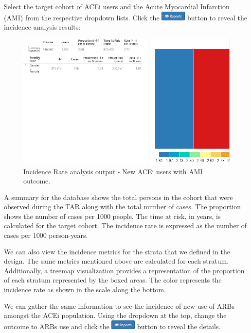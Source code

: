 \documentclass[11pt]{book}
\theoremstyle{definition}
\theoremstyle{definition}
\theoremstyle{definition}
\theoremstyle{remark}
\begin{document}
Select the target cohort of ACEi users and the Acute Myocardial Infarction (AMI) from the respective dropdown lists. Click the \includegraphics{images/Characterization/atlasIncidenceReportButton.png} button to reveal the incidence analysis results:

\begin{figure}

{\centering \includegraphics[width=1\linewidth]{images/Characterization/atlasIncidenceResults} 

}

\caption{Incidence Rate analysis output - New ACEi users with AMI outcome.}\label{fig:atlasIncidenceResults}
\end{figure}

A summary for the database shows the total persons in the cohort that were observed during the TAR along with the total number of cases. The proportion shows the number of cases per 1000 people. The time at risk, in years, is calculated for the target cohort. The incidence rate is expressed as the number of cases per 1000 person-years.

We can also view the incidence metrics for the strata that we defined in the design. The same metrics mentioned above are calculated for each stratum. Additionally, a treemap visualization provides a representation of the proportion of each stratum represented by the boxed areas. The color represents the incidence rate as shown in the scale along the bottom.

We can gather the same information to see the incidence of new use of ARBs amongst the ACEi population. Using the dropdown at the top, change the outcome to ARBs use and click the \includegraphics{images/Characterization/atlasIncidenceReportButton.png} button to reveal the details.
\end{document}
